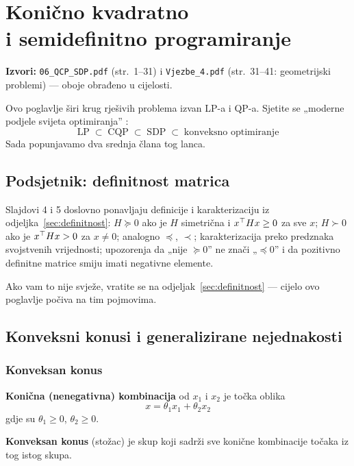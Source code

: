 \chapter[Konično kvadratno i semidefinitno programiranje]%
        {Konično kvadratno\\ i semidefinitno programiranje}
\label{ch:qcpsdp}

\begin{izvor}
\textbf{Izvori:} \texttt{06\_QCP\_SDP.pdf} (str.\ 1--31) i
\texttt{Vjezbe\_4.pdf} (str.\ 31--41: geometrijski problemi) --- oboje obrađeno
u cijelosti.
\end{izvor}

Ovo poglavlje širi krug rješivih problema izvan LP-a i QP-a. Sjetite se
„moderne podjele svijeta optimiranja” :
\[
\text{LP} \;\subset\; \text{CQP} \;\subset\; \text{SDP} \;\subset\;
\text{konveksno optimiranje}
\]
Sada popunjavamo dva srednja člana tog lanca.

\section{Podsjetnik: definitnost matrica}

Slajdovi 4 i 5 doslovno ponavljaju definicije i karakterizaciju iz
odjeljka~\ref{sec:definitnost}: $H \succeq 0$ ako je $H$ simetrična i
$x^{\top} Hx \ge 0$ za sve $x$; $H \succ 0$ ako je $x^{\top} Hx > 0$ za $x \ne 0$;
analogno $\preceq$, $\prec$; karakterizacija preko predznaka svojstvenih
vrijednosti; upozorenja da „nije $\succeq 0$” ne znači „$\preceq 0$” i da
pozitivno definitne matrice smiju imati negativne elemente.

Ako vam to nije svježe, vratite se na odjeljak~\ref{sec:definitnost} --- cijelo
ovo poglavlje počiva na tim pojmovima.

\section{Konveksni konusi i generalizirane nejednakosti}

\subsection{Konveksan konus}

\begin{definicija}
\textbf{Konična (nenegativna) kombinacija} od $x_1$ i $x_2$ je točka oblika
\[
x = \theta_1x_1 + \theta_2x_2
\]
gdje su $\theta_1 \ge 0$, $\theta_2 \ge 0$.

\textbf{Konveksan konus} (stožac) je skup koji sadrži sve konične kombinacije
točaka iz tog istog skupa.
\end{definicija}

